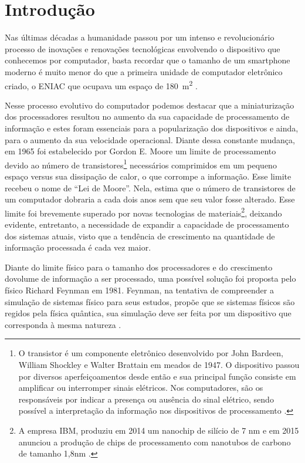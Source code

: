 \documentclass[11pt,oneside,brazil,hidelinks,article,sumario=tradicional,a4paper]{abntex2}
\renewcommand{\imprimircapa}{%
  \begin{capa}%
    \centering
    {\imprimirinstituicao\vfill}

    {\ABNTEXchapterfont\large\imprimirautor}

    \vfill
    {\ABNTEXchapterfont\bfseries\LARGE\imprimirtitulo}
    \vfill

    \large\imprimirlocal

    \large\imprimirdata

    \vspace*{15mm}
  \end{capa}
}
\begin{document}
\pretextual
\imprimircapa

\section{Introdução}

Nas últimas décadas a humanidade passou por um intenso e revolucionário processo de inovações e renovações tecnológicas envolvendo o dispositivo que conhecemos por computador, basta recordar que o tamanho de um smartphone moderno é muito menor do que a primeira unidade de computador eletrônico criado, o ENIAC que ocupava um espaço de \SI{180}{\square\meter} \cite{eniac}.

Nesse processo evolutivo do computador podemos destacar que a miniaturização dos processadores resultou no aumento da sua capacidade de processamento de informação e estes foram essenciais para a popularização dos dispositivos e ainda, para o aumento da sua velocidade operacional. Diante dessa constante mudança, em 1965 foi estabelecido por Gordon E. Moore um limite de processamento devido ao número de transistores\footnote{O transistor é um componente eletrônico desenvolvido por John Bardeen, William Shockley e Walter Brattain em meados de 1947. O dispositivo passou por diversos aperfeiçoamentos desde então e sua principal função consiste em amplificar ou interromper sinais elétricos. Nos computadores, são os responsáveis por indicar a presença ou ausência do sinal elétrico, sendo possível a interpretação da informação nos dispositivos de processamento \cite{transistor}.} necessários comprimidos em um pequeno espaço versus sua dissipação de calor, o que corrompe a informação. Esse limite recebeu o nome de ``Lei de Moore''. Nela, \textcite{moore} estima que o número de transistores de um computador dobraria a cada dois anos sem que seu valor fosse alterado. Esse limite foi brevemente superado por novas tecnologias de materiais\footnote{A empresa IBM, produziu em 2014 um nanochip de silício de 7 nm e em 2015 anunciou a produção de chips de processamento com nanotubos de carbono de tamanho 1,8nm \cite{chipibm}.}, deixando evidente, entretanto, a necessidade de expandir a capacidade de processamento dos sistemas atuais, visto que a tendência de crescimento na quantidade de informação processada é cada vez maior.

Diante do limite físico para o tamanho dos processadores e do crescimento dovolume de informação a ser processado, uma possível solução foi proposta pelo físico Richard Feynman em 1981. Feynman, na tentativa de compreender a simulação de sistemas físico para seus estudos, propõe que se sistemas físicos são regidos pela física quântica, sua simulação deve ser feita por um dispositivo que corresponda à mesma natureza \cite{caldeira}.
\end{document}

